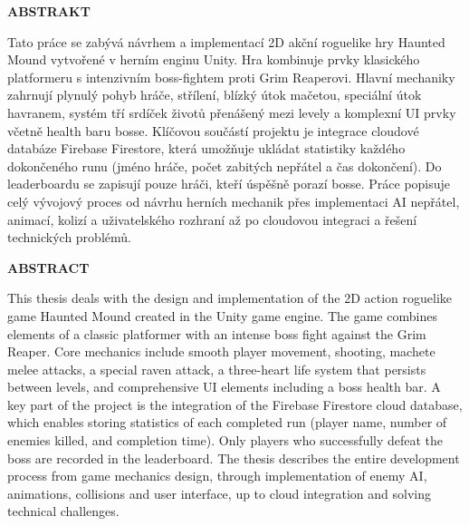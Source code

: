 \documentclass[12pt,a4paper]{article}
\begin{document}
	\newpage
	
	
	\textbf{ABSTRAKT}
	
	\vspace{1cm}
	
Tato práce se zabývá návrhem a implementací 2D akční roguelike hry Haunted Mound vytvořené v herním enginu Unity. Hra kombinuje prvky klasického platformeru s intenzivním boss-fightem proti Grim Reaperovi. Hlavní mechaniky zahrnují plynulý pohyb hráče, střílení, blízký útok mačetou, speciální útok havranem, systém tří srdíček životů přenášený mezi levely a komplexní UI prvky včetně health baru bosse.
Klíčovou součástí projektu je integrace cloudové databáze Firebase Firestore, která umožňuje ukládat statistiky každého dokončeného runu (jméno hráče, počet zabitých nepřátel a čas dokončení). Do leaderboardu se zapisují pouze hráči, kteří úspěšně porazí bosse. Práce popisuje celý vývojový proces od návrhu herních mechanik přes implementaci AI nepřátel, animací, kolizí a uživatelského rozhraní až po cloudovou integraci a řešení technických problémů.
	
	\vspace{1cm}
	
	\textbf{ABSTRACT}
	
	\vspace{1cm}
	
This thesis deals with the design and implementation of the 2D action roguelike game Haunted Mound created in the Unity game engine. The game combines elements of a classic platformer with an intense boss fight against the Grim Reaper. Core mechanics include smooth player movement, shooting, machete melee attacks, a special raven attack, a three-heart life system that persists between levels, and comprehensive UI elements including a boss health bar.
A key part of the project is the integration of the Firebase Firestore cloud database, which enables storing statistics of each completed run (player name, number of enemies killed, and completion time). Only players who successfully defeat the boss are recorded in the leaderboard. The thesis describes the entire development process from game mechanics design, through implementation of enemy AI, animations, collisions and user interface, up to cloud integration and solving technical challenges.
	
	\vspace{2cm}
	
	\newpage
	
\tableofcontents

\newpage
	
\end{document}

